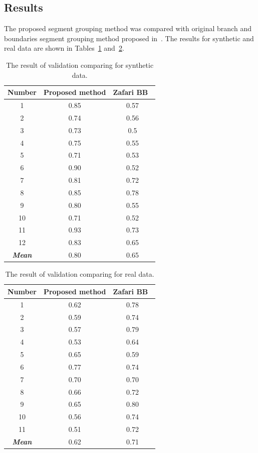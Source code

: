 \documentclass{lutmscthesis}[2010/09/22]
\begin{document}
\subsection{Results}

The proposed segment grouping method was compared with original branch and boundaries segment grouping method proposed in~\cite{zafari-bb}. The results for synthetic and real data are shown in Tables~\ref{tab:syndata} and~\ref{tab:realdata}.


\begin{table}[hpt]
\begin{center}
\caption{The result of validation comparing for synthetic data.\label{tab:syndata}}
\begin{tabular}{ |c||c|c|  }
 \hline
 Number & Proposed method & Zafari BB~\cite{zafari-bb}\\
 \hline
 1   &  0.85&  0.57\\
 2   &  0.74&  0.56\\
 3   &  0.73&  0.5\\
 4   &  0.75&  0.55\\
 5   &  0.71&  0.53\\
 6   &  0.90&  0.52\\
 7   &  0.81&  0.72\\
 8   &  0.85&  0.78\\
 9   &  0.80&  0.55\\
 10  &  0.71&  0.52\\
 11  &  0.93&  0.73\\
 12  &  0.83&  0.65\\
 \hline
 \textbf{\textit{Mean}} & 0.80 & 0.65 \\
 \hline
\end{tabular}
\end{center}
\end{table}


\begin{table}[hpt]
\begin{center}
\caption{The result of validation comparing for real data.\label{tab:realdata}}
\begin{tabular}{ |c||c|c|  }

 \hline
 Number & Proposed method & Zafari BB~\cite{zafari-bb}\\
 \hline
 1   &  0.62&  0.78\\
 2   &  0.59&  0.74\\
 3   &  0.57&  0.79\\
 4   &  0.53&  0.64\\
 5   &  0.65&  0.59\\
 6   &  0.77&  0.74\\
 7   &  0.70&  0.70\\
 8   &  0.66&  0.72\\
 9   &  0.65&  0.80\\
 10  &  0.56&  0.74\\
 11  &  0.51&  0.72\\
 \hline
 \textbf{\textit{Mean}} & 0.62 & 0.71\\
 \hline
\end{tabular}
\end{center}
\end{table}
\end{document}
